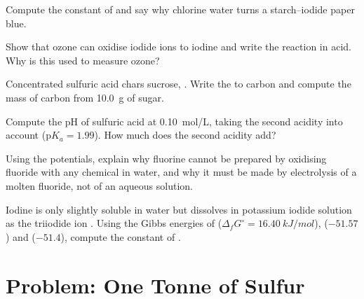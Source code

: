 \begin{exercise}[$\star\star$]\label{exo:b1:p-block-16-18:7}
Compute the constant of  and say why chlorine
water turns a starch--iodide paper blue.
\end{exercise}

\begin{exercise}[$\star\star$]\label{exo:b1:p-block-16-18:8}
Show that ozone can oxidise iodide ions to iodine and write the reaction in
acid. Why is this used to measure ozone?
\end{exercise}

\begin{exercise}[$\star\star$]\label{exo:b1:p-block-16-18:9}
Concentrated sulfuric acid chars sucrose, . Write the
 to carbon and compute the mass of carbon from \qty{10.0}{g} of
sugar.
\end{exercise}

\begin{exercise}[$\star\star\star$]\label{exo:b1:p-block-16-18:10}
Compute the pH of sulfuric acid at \qty{0.10}{mol/L}, taking the second
acidity into account ($\mathrm{p}K_a = 1.99$). How much does the second
acidity add?
\end{exercise}

\begin{exercise}[$\star\star\star$]\label{exo:b1:p-block-16-18:11}
Using the potentials, explain why fluorine cannot be prepared by oxidising
fluoride with any chemical  in water, and why it must be made by
electrolysis of a molten fluoride, not of an aqueous solution.
\end{exercise}

\begin{exercise}[$\star\star\star$]\label{exo:b1:p-block-16-18:12}
Iodine is only slightly soluble in water but dissolves in potassium iodide
solution as the triiodide ion . Using the Gibbs energies of
 ($\Delta_f G^\circ = \qty{16.40}{kJ/mol}$),  ($-51.57$)
and  ($-51.4$), compute the constant of .
\end{exercise}

\section{Problem: One Tonne of Sulfur}

